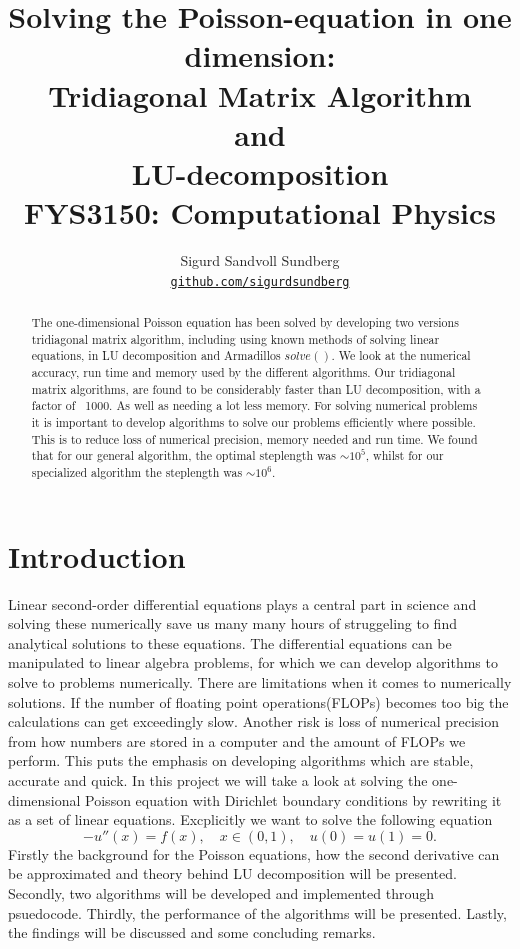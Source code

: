 \documentclass[10pt, a4paper]{amsart}
\title[Solving the Poisson-equation in one dimension]{Solving the Poisson-equation in one dimension: \\
\normalsize{Tridiagonal Matrix Algorithm\\
 and \\
 LU-decomposition} \\
  \hrulefill\small{ FYS3150: Computational Physics }\hrulefill}
\author[Sundberg]{Sigurd Sandvoll Sundberg \\
  \href{https://github.com/SigurdSundberg/FYS3150/tree/master/project1}{\texttt{github.com/sigurdsundberg}}}
\begin{document}
\begin{titlepage}
\begin{abstract}
The one-dimensional Poisson equation has been solved by developing two versions tridiagonal matrix algorithm, including using known methods of solving linear equations, in LU decomposition and Armadillos $solve()$. We look at the numerical accuracy, run time and memory used by the different algorithms. Our tridiagonal matrix algorithms, are found to be considerably faster than LU decomposition, with a factor of ~1000. As well as needing a lot less memory. For solving numerical problems it is important to develop algorithms to solve our problems efficiently where possible. This is to reduce loss of numerical precision, memory needed and run time. We found that for our general algorithm, the optimal steplength was $\sim10^{5}$, whilst for our specialized algorithm the steplength was $\sim10^{6}$. 
\end{abstract}
\maketitle
\tableofcontents
\end{titlepage}

\section{Introduction}
Linear second-order differential equations plays a central part in science and solving these numerically save us many many hours of struggeling to find analytical solutions to these equations. The differential equations can be manipulated to linear algebra problems, for which we can develop algorithms to solve to problems numerically. There are limitations when it comes to numerically solutions. If the number of floating point operations(FLOPs) becomes too big the calculations can get exceedingly slow. Another risk is loss of numerical precision from how numbers are stored in a computer and the amount of FLOPs we perform. This puts the emphasis on developing algorithms which are stable, accurate and quick. 
In this project we will take a look at solving the one-dimensional Poisson equation with Dirichlet boundary conditions by rewriting it as a set of linear equations. Excplicitly we want to solve the following equation
\begin{equation}
-u''(x) = f(x), \quad x\in(0,1), \quad u(0)=u(1)=0.\label{eq:base}
\end{equation}
Firstly the background for the Poisson equations, how the second derivative can be approximated and theory behind LU decomposition will be presented. Secondly, two algorithms will be developed and implemented through psuedocode. Thirdly, the performance of the algorithms will be presented. Lastly, the findings will be discussed and some concluding remarks. 
\end{document}
